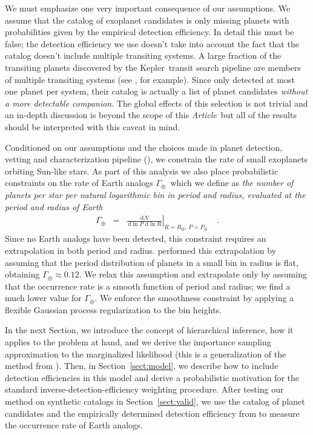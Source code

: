 \documentclass[12pt,preprint]{aastex}
\newcommand{\project}[1]{{\sffamily #1}}
\newcommand{\kepler}{\project{Kepler}}
\newcommand{\paper}{\textsl{Article}}
\newcommand{\Sect}[1]{Section~\ref{sect:#1}}
\newcommand{\sect}[1]{\Sect{#1}}
\newcommand{\dd}{\ensuremath{\,\mathrm{d}}}
\newcommand{\rate}{\ensuremath{\Gamma}}
\newcommand{\radius}{\ensuremath{R}}
\newcommand{\period}{\ensuremath{P}}
\newcommand{\gammaearth}{{\ensuremath{\rate_\oplus}}}
\begin{document}
We must emphasize one very important consequence of our assumptions.
We assume that the catalog of exoplanet candidates is only missing planets
with probabilities given by the empirical detection efficiency.
In detail this must be false; the detection efficiency we use
doesn't take into account the fact that the catalog doesn't include multiple
transiting systems.
A large fraction of the transiting planets discovered by the \kepler\ transit
search pipeline are members of multiple transiting systems (see
\citealt{lissauer}, for example).
Since \citet{petigura} only detected at most one planet per system, their
catalog is actually a list of planet candidates \emph{without a more
detectable companion}.
The global effects of this selection is not trivial and an in-depth discussion
is beyond the scope of this \paper\ but all of the results should be
interpreted with this caveat in mind.

Conditioned on our assumptions and the choices made in planet detection,
vetting and characterization pipeline (\citealt{petigura-a, petigura}), we
constrain the rate of small exoplanets orbiting Sun-like stars.
As part of this analysis we also place probabilistic constraints on the rate
of Earth analogs \gammaearth\ which we define as \emph{the number of planets
per star per natural logarithmic bin in period and radius, evaluated at the
period and radius of Earth}
\begin{eqnarray}
\gammaearth &=&
\left.\frac{\dd N}{\dd\ln\period\,\dd\ln\radius}\right|
_{\radius=\radius_\oplus,\,\period=\period_\oplus}\quad.
\end{eqnarray}
Since no Earth analogs have been detected, this constraint requires an
extrapolation in both period and radius.
\citet{petigura} performed this extrapolation by assuming that the period
distribution of planets in a small bin in radius is flat, obtaining
$\gammaearth \approx 0.12$.
We relax this assumption and extrapolate only by assuming that the occurrence
rate is a smooth function of period and radius; we find a much lower value for
\gammaearth.
We enforce the smoothness constraint by applying a flexible Gaussian process
regularization to the bin heights.

In the next Section, we introduce the concept of hierarchical inference, how
it applies to the problem at hand, and we derive the importance sampling
approximation to the marginalized likelihood (this is a generalization of the
method from \citealt{hogge}).
Then, in \sect{model}, we describe how to include detection efficiencies in
this model and derive a probabilistic motivation for the standard
inverse-detection-efficiency weighting procedure.
After testing our method on synthetic catalogs in \sect{valid}, we use the
catalog of planet candidates and the empirically determined detection
efficiency from \citet{petigura} to measure the occurrence rate of Earth
analogs.
\end{document}
